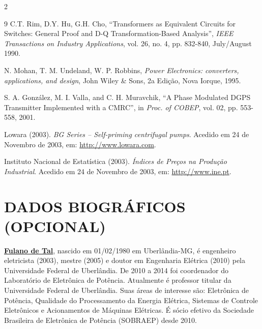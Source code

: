 \documentclass{ceel}
\begin{document}
\begin{multicols}{2}
\begin{thebibliography}{9}
  C.T. Rim, D.Y. Hu, G.H. Cho,
   “Transformers as Equivalent Circuits for Switches: General Proof and D-Q Transformation-Based Analysis”,
   \emph{ IEEE Transactions on Industry Applications}, vol. 26, no. 4, pp. 832-840, July/August 1990.
   
 N. Mohan, T. M. Undeland, W. P. Robbins, 
 \emph{Power Electronics: converters, applications, and design}, 
 John Wiley \& Sons, 2a Edição, Nova Iorque, 1995.
 
S. A. González, M. I. Valla, and C. H. Muravchik, 
“A Phase Modulated DGPS Transmitter Implemented with a CMRC”, 
in \emph{Proc. of COBEP}, vol. 02, pp. 553-558, 2001.

Lowara (2003). \emph{BG Series – Self-priming centrifugal pumps}. Acedido em 24 de Novembro de 2003, em: \url{http://www.lowara.com}.

	Instituto Nacional de Estatística (2003). \emph{Índices de Preços na Produção Industrial}. Acedido em 24 de Novembro de 2003, em: \url{http://www.ine.pt}.

\end{thebibliography}

\section*{DADOS BIOGRÁFICOS (OPCIONAL)}
\noindent \underline{\textbf{Fulano de Tal}}, nascido em 01/02/1980 em Uberlândia-MG, é engenheiro eletricista (2003), mestre (2005) e doutor em Engenharia Elétrica (2010) pela Universidade Federal de Uberlândia. De 2010 a 2014 foi coordenador do Laboratório de Eletrônica de Potência. Atualmente é professor titular da Universidade Federal de Uberlândia. Suas áreas de interesse são: Eletrônica de Potência, Qualidade do Processamento da Energia Elétrica, Sistemas de Controle Eletrônicos e Acionamentos de Máquinas Elétricas. É sócio efetivo da Sociedade Brasileira de Eletrônica de Potência (SOBRAEP) desde 2010.





\end{multicols}
\end{document}
